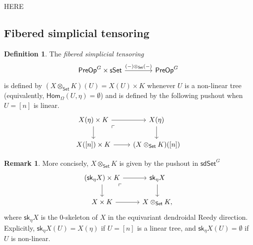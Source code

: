 \documentclass[a4paper,10pt
,draft
]{article}%
\numberwithin{equation}{section}
\numberwithin{figure}{section}
\theoremstyle{definition} %
\newtheorem{definition}[equation]{Definition}%
\newtheorem{remark}[equation]{Remark}%
\newcommand{\1}{\ensuremath{\mathbbm 1}}%
\begin{document}
{\color{red} HERE}



















\subsection{Fibered simplicial tensoring}
\label{FIBTENS_SEC}


\begin{definition}
	The \textit{fibered simplicial tensoring} 
\[
	\begin{tikzcd}[row sep = 0, column sep = 40pt]
	\mathsf{PreOp}^G \times \mathsf{sSet} \ar{r}{(-)\otimes_{\mathsf{Set}}(-)} &
	\mathsf{PreOp}^G
	\end{tikzcd}
\]
	is defined by $(X \otimes_{\mathsf{Set}} K)(U) = X(U) \times K$
	whenever $U$ is a non-linear tree (equivalently, 
	$\mathsf{Hom}_{\Omega}(U,\eta)=\emptyset$) and
	is defined by the following pushout when $U=[n]$ is linear.
\[
	\begin{tikzcd}
	X(\eta) \times K \ar{r} \ar{d} \arrow[dr, phantom, "\ulcorner", very near start]  &
	X(\eta) \ar{d}
	\\
	X([n]) \times K \ar{r} & 
	(X \otimes_{\mathsf{Set}} K)([n]) 
	\end{tikzcd}
\]
\end{definition}



\begin{remark}
	More concisely, $X \otimes_{\mathsf{Set}} K$ is given by the pushout in $\mathsf{sdSet}^G$
	\[
	\begin{tikzcd}
	\left(\mathsf{sk}_{\eta}X \right) \times K \ar{r} \ar{d} \arrow[dr, phantom, "\ulcorner", very near start]  &
	\mathsf{sk}_{\eta}X \ar{d}
	\\
	X \times K \ar{r} & 
	X \otimes_{\mathsf{Set}} K,
	\end{tikzcd}
	\]
	where $\mathsf{sk}_{\eta}X$ is the 0-skeleton of $X$ in the equivariant dendroidal Reedy direction.
	Explicitly, $\mathsf{sk}_{\eta}X(U) = X(\eta)$ if $U = [n]$ is a linear tree, 
	and $\mathsf{sk}_\eta X(U) = \emptyset$ if $U$ is non-linear.
\end{remark}
\end{document}
